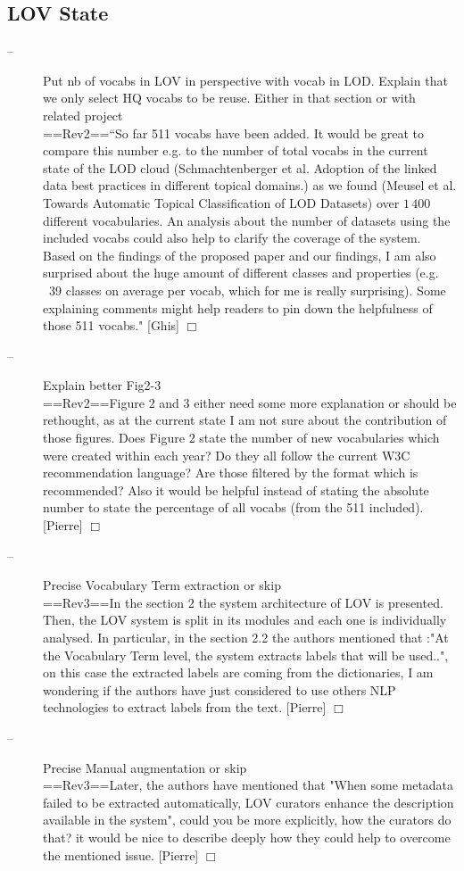 \documentclass[a4paper,notitlepage]{article}
\newcommand\todo[2]{\item[--] #1 \hfill[#2] $\Box$}%
\begin{document}
\subsection{LOV State}
\begin{description}
  \todo{Put nb of vocabs in LOV in perspective with vocab in LOD. Explain that we only select HQ vocabs to be reuse. Either in that section or with related project\\
==Rev2==``So far 511 vocabs have been added. It would be great to compare this number e.g. to the number of total vocabs in the current state of the LOD cloud (Schmachtenberger et al. Adoption of the linked data best practices in different topical domains.) as we found (Meusel et al. Towards Automatic Topical Classification of LOD Datasets) over $1\,400$ different vocabularies.
An analysis about the number of datasets using the included vocabs could also help to clarify the coverage of the system. Based on the findings of the proposed paper and our findings, I am also surprised about the huge amount of different classes and properties (e.g. ~39 classes on average per vocab, which for me is really surprising). Some explaining comments might help readers to pin down the helpfulness of those 511 vocabs."}{Ghis}

 \todo{Explain better Fig2-3 \\
==Rev2==Figure 2 and 3 either need some more explanation or should be rethought, as at the current state I am not sure about the contribution of those figures. Does Figure 2 state the number of new vocabularies which were created within each year? Do they all follow the current W3C recommendation language? Are those filtered by the format which is recommended? Also it would be helpful instead of stating the absolute number to state the percentage of all vocabs (from the 511 included).}{Pierre}

 \todo{Precise Vocabulary Term extraction or skip\\
==Rev3==In the section 2 the system architecture of LOV is presented. Then, the LOV system is split in its modules and each one is individually analysed. In particular, in the section 2.2 the authors mentioned that :"At the Vocabulary Term level, the system extracts labels that will be used..", on this case the extracted labels are coming from the dictionaries, I am wondering if the authors have just considered to use others NLP technologies to extract labels from the text.}{Pierre}

 \todo{Precise Manual augmentation or skip\\
==Rev3==Later, the authors have mentioned that "When some metadata failed to be extracted automatically, LOV curators enhance the description available in the system", could you be more explicitly, how the curators do that? it would be nice to describe deeply how they could help to overcome the mentioned issue.}{Pierre}


\end{description}
\end{document}
